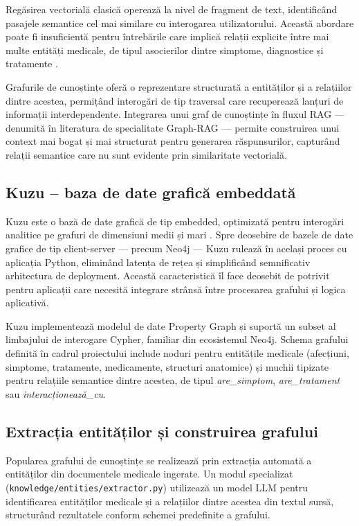 \documentclass[12pt, a4paper, oneside, romanian]{teza-upb}
\begin{document}
Regăsirea vectorială clasică operează la nivel de fragment de text, identificând pasajele semantice cel mai similare cu interogarea utilizatorului. Această abordare poate fi insuficientă pentru întrebările care implică relații explicite între mai multe entități medicale, de tipul asocierilor dintre simptome, diagnostice și tratamente \cite{lewis2020retrieval}.

Grafurile de cunoștințe oferă o reprezentare structurată a entităților și a relațiilor dintre acestea, permițând interogări de tip traversal care recuperează lanțuri de informații interdependente. Integrarea unui graf de cunoștințe în fluxul RAG — denumită în literatura de specialitate Graph-RAG \cite{edge2024local} — permite construirea unui context mai bogat și mai structurat pentru generarea răspunsurilor, capturând relații semantice care nu sunt evidente prin similaritate vectorială.

\subsection{Kuzu -- baza de date grafică embeddată}

Kuzu este o bază de date grafică de tip embedded, optimizată pentru interogări analitice pe grafuri de dimensiuni medii și mari \cite{kuzu_doc}. Spre deosebire de bazele de date grafice de tip client-server — precum Neo4j — Kuzu rulează în același proces cu aplicația Python, eliminând latența de rețea și simplificând semnificativ arhitectura de deployment. Această caracteristică îl face deosebit de potrivit pentru aplicații care necesită integrare strânsă între procesarea grafului și logica aplicativă.

Kuzu implementează modelul de date Property Graph și suportă un subset al limbajului de interogare Cypher, familiar din ecosistemul Neo4j. Schema grafului definită în cadrul proiectului include noduri pentru entitățile medicale (afecțiuni, simptome, tratamente, medicamente, structuri anatomice) și muchii tipizate pentru relațiile semantice dintre acestea, de tipul \textit{are\_simptom}, \textit{are\_tratament} sau \textit{interacționează\_cu}.

\subsection{Extracția entităților și construirea grafului}

Popularea grafului de cunoștințe se realizează prin extracția automată a entităților din documentele medicale ingerate. Un modul specializat (\texttt{knowledge/entities/extractor.py}) utilizează un model LLM pentru identificarea entităților medicale și a relațiilor dintre acestea din textul sursă, structurând rezultatele conform schemei predefinite a grafului.
\end{document}
